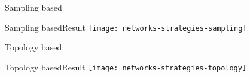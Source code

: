 \begin{frame}{Sampling based}

\end{frame}

\begin{frame}{Sampling based}{Result}
	\centering
	\texttt{[image: networks-strategies-sampling]}
\end{frame}

\begin{frame}{Topology based}

\end{frame}

\begin{frame}{Topology based}{Result}
	\centering
	\texttt{[image: networks-strategies-topology]}
\end{frame}

